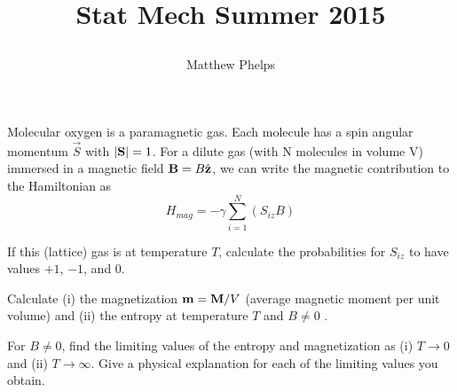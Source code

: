\documentclass[10pt,letterpaper]{article}
\title{\begin{spacing}{1.2}Stat Mech Summer 2015\end{spacing}}
\author{Matthew Phelps}
\date{}
\begin{document}
\maketitle

\benum
  	 \item
	 Molecular oxygen is a paramagnetic gas. Each molecule has a spin angular momentum $\vec S$ 
	 with $|\mathbf{S}|=1$. For a dilute gas (with N molecules in volume V) immersed in a magnetic field 
	 $\mathbf{B} = B\hat{\mathbf{z}}$, we can write the magnetic contribution to the Hamiltonian as
	 \[
	 	H_{mag} = -\gamma \sum_{i=1}^N (S_{iz}B)
	\]

	\benum
	\item
	If this (lattice) gas is at temperature $T$, calculate the probabilities for $S_{iz}$ to have values
	$+1$, $-1$, and $0$.
	
	\item
	Calculate (i) the magnetization $\mathbf{m} = \mathbf{M}/V$ (average magnetic moment per unit volume)
	and (ii) the entropy at temperature $T$ and $B\ne 0$	.
	\item
	For $B\ne 0$, find the limiting values of the entropy and magnetization as (i) $T\to 0$ and (ii) $T\to \infty$. 
	Give a physical explanation for each of the limiting values you obtain. \\ \\
	\eenum
	
\end{document}
